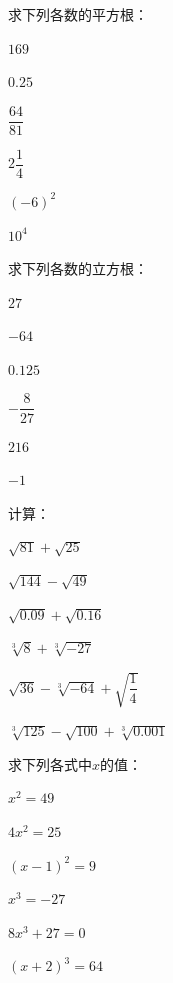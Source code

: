 \documentclass[a4paper,12pt]{ctexart}
\begin{document}
\begin{exercise}
\item 求下列各数的平方根：
  \begin{subexercise}
    \item $169$
    \item $0.25$
    \item $\dfrac{64}{81}$
    \item $2\dfrac{1}{4}$
    \item $(-6)^2$
    \item $10^4$
  \end{subexercise}

\item 求下列各数的立方根：
  \begin{subexercise}
    \item $27$
    \item $-64$
    \item $0.125$
    \item $-\dfrac{8}{27}$
    \item $216$
    \item $-1$
  \end{subexercise}

\item 计算：
  \begin{subexercise}
    \item $\sqrt{81}+\sqrt{25}$
    \item $\sqrt{144}-\sqrt{49}$
    \item $\sqrt{0.09}+\sqrt{0.16}$
    \item $\sqrt[3]{8}+\sqrt[3]{-27}$
    \item $\sqrt{36}-\sqrt[3]{-64}+\sqrt{\dfrac{1}{4}}$
    \item $\sqrt[3]{125}-\sqrt{100}+\sqrt[3]{0.001}$
  \end{subexercise}

\item 求下列各式中$x$的值：
  \begin{subexercise}
    \item $x^2=49$
    \item $4x^2=25$
    \item $(x-1)^2=9$
    \item $x^3=-27$
    \item $8x^3+27=0$
    \item $(x+2)^3=64$
  \end{subexercise}
\end{exercise}

\newpage
\end{document}
